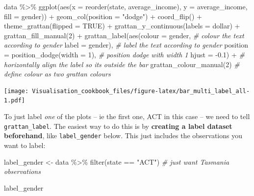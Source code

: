 \documentclass[
]{book}
\newenvironment{Shaded}{\begin{snugshade}}{\end{snugshade}}
\newcommand{\AttributeTok}[1]{\textcolor[rgb]{0.77,0.63,0.00}{#1}}
\newcommand{\CommentTok}[1]{\textcolor[rgb]{0.56,0.35,0.01}{\textit{#1}}}
\newcommand{\ConstantTok}[1]{\textcolor[rgb]{0.00,0.00,0.00}{#1}}
\newcommand{\DecValTok}[1]{\textcolor[rgb]{0.00,0.00,0.81}{#1}}
\newcommand{\FloatTok}[1]{\textcolor[rgb]{0.00,0.00,0.81}{#1}}
\newcommand{\FunctionTok}[1]{\textcolor[rgb]{0.00,0.00,0.00}{#1}}
\newcommand{\NormalTok}[1]{#1}
\newcommand{\OtherTok}[1]{\textcolor[rgb]{0.56,0.35,0.01}{#1}}
\newcommand{\SpecialCharTok}[1]{\textcolor[rgb]{0.00,0.00,0.00}{#1}}
\newcommand{\StringTok}[1]{\textcolor[rgb]{0.31,0.60,0.02}{#1}}
\begin{document}
\begin{Shaded}
\begin{Highlighting}[]
\NormalTok{data }\SpecialCharTok{\%\textgreater{}\%} 
  \FunctionTok{ggplot}\NormalTok{(}\FunctionTok{aes}\NormalTok{(}\AttributeTok{x =} \FunctionTok{reorder}\NormalTok{(state, average\_income), }
             \AttributeTok{y =}\NormalTok{ average\_income,}
             \AttributeTok{fill =}\NormalTok{ gender)) }\SpecialCharTok{+} 
  \FunctionTok{geom\_col}\NormalTok{(}\AttributeTok{position =} \StringTok{"dodge"}\NormalTok{) }\SpecialCharTok{+} 
  \FunctionTok{coord\_flip}\NormalTok{() }\SpecialCharTok{+} 
  \FunctionTok{theme\_grattan}\NormalTok{(}\AttributeTok{flipped =} \ConstantTok{TRUE}\NormalTok{) }\SpecialCharTok{+} 
  \FunctionTok{grattan\_y\_continuous}\NormalTok{(}\AttributeTok{labels =}\NormalTok{ dollar) }\SpecialCharTok{+} 
  \FunctionTok{grattan\_fill\_manual}\NormalTok{(}\DecValTok{2}\NormalTok{) }\SpecialCharTok{+} 
  \FunctionTok{grattan\_label}\NormalTok{(}\FunctionTok{aes}\NormalTok{(}\AttributeTok{colour =}\NormalTok{ gender,  }\CommentTok{\# colour the text according to gender}
                    \AttributeTok{label =}\NormalTok{ gender),  }\CommentTok{\# label the text according to gender}
            \AttributeTok{position =} \FunctionTok{position\_dodge}\NormalTok{(}\AttributeTok{width =} \DecValTok{1}\NormalTok{),  }\CommentTok{\# position dodge with width 1}
            \AttributeTok{hjust =} \SpecialCharTok{{-}}\FloatTok{0.1}\NormalTok{) }\SpecialCharTok{+}  \CommentTok{\# horizontally align the label so its outside the bar}
  \FunctionTok{grattan\_colour\_manual}\NormalTok{(}\DecValTok{2}\NormalTok{)   }\CommentTok{\# define colour as two grattan colours}
\end{Highlighting}
\end{Shaded}

\texttt{[image: Visualisation\_cookbook\_files/figure-latex/bar\_multi\_label\_all-1.pdf]}

To just label \emph{one} of the plots -- ie the first one, ACT in this case -- we need to tell \texttt{grattan\_label}. The easiest way to do this is by \textbf{creating a label dataset beforehand}, like \texttt{label\_gender} below. This just includes the observations you want to label:

\begin{Shaded}
\begin{Highlighting}[]
\NormalTok{label\_gender }\OtherTok{\textless{}{-}}\NormalTok{ data }\SpecialCharTok{\%\textgreater{}\%} 
  \FunctionTok{filter}\NormalTok{(state }\SpecialCharTok{==} \StringTok{"ACT"}\NormalTok{)  }\CommentTok{\# just want Tasmania observations}

\NormalTok{label\_gender}
\end{Highlighting}
\end{Shaded}
\end{document}
